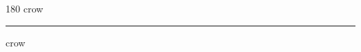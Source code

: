
\begin{frame}
\begin{center}
\begin{turn}{180}
{\fontsize{2.5cm}{1em}\selectfont crow}
\end{turn}
\vspace{1em}\par  
\hrule
\vspace{1em}\par  
{\fontsize{2.5cm}{1em}\selectfont crow}
\end{center}
\end{frame}
